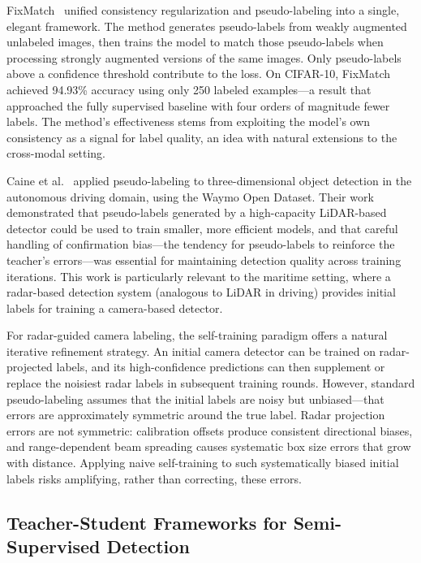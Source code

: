 FixMatch~\cite{sohn2020fixmatch} unified consistency regularization and pseudo-labeling into a single, elegant framework. The method generates pseudo-labels from weakly augmented unlabeled images, then trains the model to match those pseudo-labels when processing strongly augmented versions of the same images. Only pseudo-labels above a confidence threshold contribute to the loss. On CIFAR-10, FixMatch achieved 94.93\% accuracy using only 250 labeled examples---a result that approached the fully supervised baseline with four orders of magnitude fewer labels. The method's effectiveness stems from exploiting the model's own consistency as a signal for label quality, an idea with natural extensions to the cross-modal setting.

Caine et al.~\cite{caine2021pseudo} applied pseudo-labeling to three-dimensional object detection in the autonomous driving domain, using the Waymo Open Dataset. Their work demonstrated that pseudo-labels generated by a high-capacity LiDAR-based detector could be used to train smaller, more efficient models, and that careful handling of confirmation bias---the tendency for pseudo-labels to reinforce the teacher's errors---was essential for maintaining detection quality across training iterations. This work is particularly relevant to the maritime setting, where a radar-based detection system (analogous to LiDAR in driving) provides initial labels for training a camera-based detector.

For radar-guided camera labeling, the self-training paradigm offers a natural iterative refinement strategy. An initial camera detector can be trained on radar-projected labels, and its high-confidence predictions can then supplement or replace the noisiest radar labels in subsequent training rounds. However, standard pseudo-labeling assumes that the initial labels are noisy but unbiased---that errors are approximately symmetric around the true label. Radar projection errors are not symmetric: calibration offsets produce consistent directional biases, and range-dependent beam spreading causes systematic box size errors that grow with distance. Applying naive self-training to such systematically biased initial labels risks amplifying, rather than correcting, these errors.



\subsection{Teacher-Student Frameworks for Semi-Supervised Detection}\label{subsec:teacher_student}

